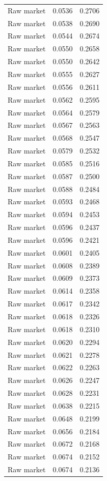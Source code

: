 \begin{table}[htbp]
\begin{tabular}{lll}
Raw market & 0.0536 & 0.2706 \\
Raw market & 0.0538 & 0.2690 \\
Raw market & 0.0544 & 0.2674 \\
Raw market & 0.0550 & 0.2658 \\
Raw market & 0.0550 & 0.2642 \\
Raw market & 0.0555 & 0.2627 \\
Raw market & 0.0556 & 0.2611 \\
Raw market & 0.0562 & 0.2595 \\
Raw market & 0.0564 & 0.2579 \\
Raw market & 0.0567 & 0.2563 \\
Raw market & 0.0568 & 0.2547 \\
Raw market & 0.0579 & 0.2532 \\
Raw market & 0.0585 & 0.2516 \\
Raw market & 0.0587 & 0.2500 \\
Raw market & 0.0588 & 0.2484 \\
Raw market & 0.0593 & 0.2468 \\
Raw market & 0.0594 & 0.2453 \\
Raw market & 0.0596 & 0.2437 \\
Raw market & 0.0596 & 0.2421 \\
Raw market & 0.0601 & 0.2405 \\
Raw market & 0.0608 & 0.2389 \\
Raw market & 0.0609 & 0.2373 \\
Raw market & 0.0614 & 0.2358 \\
Raw market & 0.0617 & 0.2342 \\
Raw market & 0.0618 & 0.2326 \\
Raw market & 0.0618 & 0.2310 \\
Raw market & 0.0620 & 0.2294 \\
Raw market & 0.0621 & 0.2278 \\
Raw market & 0.0622 & 0.2263 \\
Raw market & 0.0626 & 0.2247 \\
Raw market & 0.0628 & 0.2231 \\
Raw market & 0.0638 & 0.2215 \\
Raw market & 0.0648 & 0.2199 \\
Raw market & 0.0656 & 0.2184 \\
Raw market & 0.0672 & 0.2168 \\
Raw market & 0.0674 & 0.2152 \\
Raw market & 0.0674 & 0.2136 \\

\end{tabular}
\end{table}
